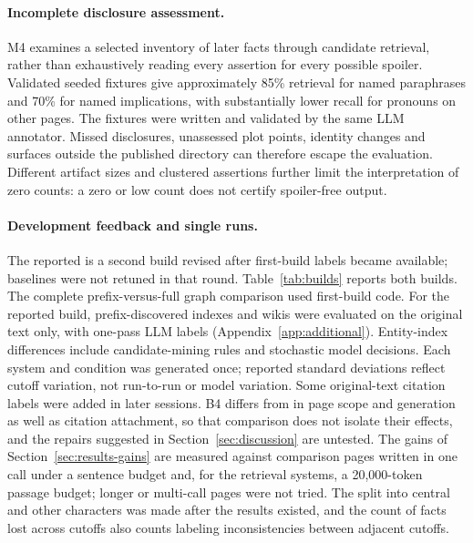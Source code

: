\paragraph{Incomplete disclosure assessment.}
M4 examines a selected inventory of later facts through candidate retrieval, rather than
exhaustively reading every assertion for every possible spoiler. Validated seeded fixtures
give approximately 85\% retrieval for named paraphrases and 70\% for named implications,
with substantially lower recall for pronouns on other pages. The fixtures were written
and validated by the same LLM annotator. Missed disclosures, unassessed plot points,
identity changes and surfaces outside the published directory can therefore escape the
evaluation. Different artifact sizes and clustered assertions further limit the
interpretation of zero counts: a zero or low count does not certify spoiler-free output.

\paragraph{Development feedback and single runs.}
The reported \sys is a second build revised after first-build labels became available;
baselines were not retuned in that round. Table~\ref{tab:builds} reports both builds.
The complete prefix-versus-full graph comparison used first-build code. For the reported
build, prefix-discovered indexes and wikis were evaluated on the original text only,
with one-pass LLM labels (Appendix~\ref{app:additional}). Entity-index differences include
candidate-mining rules and stochastic model decisions. Each system and condition was
generated once; reported standard deviations reflect cutoff variation, not run-to-run
or model variation. Some original-text citation labels were added in later sessions.
B4 differs from \sys in page scope and generation as well as citation attachment, so
that comparison does not isolate their effects, and the repairs suggested in
Section~\ref{sec:discussion} are untested.
\ifdefined\nwvtwo The gains of Section~\ref{sec:results-gains} are measured against
comparison pages written in one call under a sentence budget and, for the retrieval
systems, a 20,000-token passage budget; longer or multi-call pages were not tried. The
split into central and other characters was made after the results existed, and the count
of facts lost across cutoffs also counts labeling inconsistencies between adjacent
cutoffs.\fi

